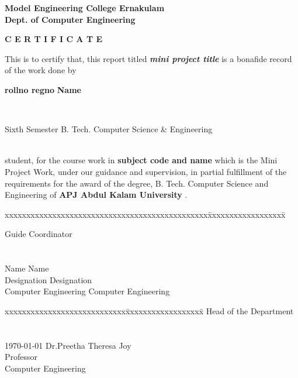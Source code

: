 \documentclass[11pt]{report}
\begin{document}
\begin{titlepage}
\begin{center}
\Large{\textbf{Model Engineering College Ernakulam}}\\
\Large{\textbf{Dept. of Computer Engineering}}\\
\end{center}
\begin{figure}[h]
\begin{center}
\end{center}
\end{figure}
\begin{center}
\Large{\textbf{C E R T I F I C A T E}}\\
\vspace{.1in}
\end{center}
This is to certify that, this report titled \textbf{\textit{mini project title}} is a bonafide record of the work done by\\
\centerline{\Large{\textbf{rollno
regno
}}	\hspace{.1in}	\Large{\textbf{Name}}}\\ 
\centerline {\textsf{Sixth Semester B. Tech. Computer Science \& Engineering }}\\
student,  for the course work in \textbf{subject code and name} which is the Mini Project Work, under our guidance and supervision, in partial 
 fulfillment of the requirements for the award of the degree, B. Tech. Computer 
Science  and Engineering of \textbf{APJ Abdul Kalam University }.
\vspace{.1in}
\begin{tabbing}
xxxxxxxxxxxxxxxxxxxxxxxxxxxxxxxxxxxxxxxxxxxxxxx\= xxxxxxxxxxxxxxxxxx\= \kill

Guide			\>				Coordinator
\\
\\
\\
Name  \>Name\\
Designation	\>Designation\\
Computer Engineering	\>	Computer Engineering
\end{tabbing}
\vspace{.08in}
%
\begin{tabbing}
xxxxxxxxxxxxxxxxxxxxxxxxxxxx\= xxxxxxxxxxxxxxxxxx\= \kill
			\>Head of the Department \\
\\
\\
\today
\>Dr.Preetha Theresa Joy\\
\>Professor\\
\>Computer Engineering\\
\end{tabbing}
\end{titlepage}
\end{document}
